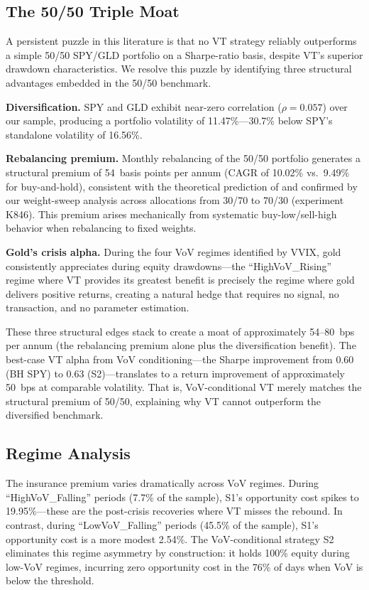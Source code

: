\documentclass[12pt,a4paper]{article}
\begin{document}
\subsection{The 50/50 Triple Moat}

A persistent puzzle in this literature is that no VT strategy reliably outperforms a simple 50/50 SPY/GLD portfolio on a Sharpe-ratio basis, despite VT's superior drawdown characteristics. We resolve this puzzle by identifying three structural advantages embedded in the 50/50 benchmark.

\textbf{Diversification.} SPY and GLD exhibit near-zero correlation ($\rho = 0.057$) over our sample, producing a portfolio volatility of 11.47\%---30.7\% below SPY's standalone volatility of 16.56\%.

\textbf{Rebalancing premium.} Monthly rebalancing of the 50/50 portfolio generates a structural premium of 54~basis points per annum (CAGR of 10.02\% vs.\ 9.49\% for buy-and-hold), consistent with the theoretical prediction of \citet{booth1992} and confirmed by our weight-sweep analysis across allocations from 30/70 to 70/30 (experiment K846). This premium arises mechanically from systematic buy-low/sell-high behavior when rebalancing to fixed weights.

\textbf{Gold's crisis alpha.} During the four VoV regimes identified by VVIX, gold consistently appreciates during equity drawdowns---the ``HighVoV\_Rising'' regime where VT provides its greatest benefit is precisely the regime where gold delivers positive returns, creating a natural hedge that requires no signal, no transaction, and no parameter estimation.

These three structural edges stack to create a moat of approximately 54--80~bps per annum (the rebalancing premium alone plus the diversification benefit). The best-case VT alpha from VoV conditioning---the Sharpe improvement from 0.60 (BH SPY) to 0.63 (S2)---translates to a return improvement of approximately 50~bps at comparable volatility. That is, VoV-conditional VT merely matches the structural premium of 50/50, explaining why VT cannot outperform the diversified benchmark.

\subsection{Regime Analysis}

The insurance premium varies dramatically across VoV regimes. During ``HighVoV\_Falling'' periods (7.7\% of the sample), S1's opportunity cost spikes to 19.95\%---these are the post-crisis recoveries where VT misses the rebound. In contrast, during ``LowVoV\_Falling'' periods (45.5\% of the sample), S1's opportunity cost is a more modest 2.54\%. The VoV-conditional strategy S2 eliminates this regime asymmetry by construction: it holds 100\% equity during low-VoV regimes, incurring zero opportunity cost in the 76\% of days when VoV is below the threshold.
\end{document}
